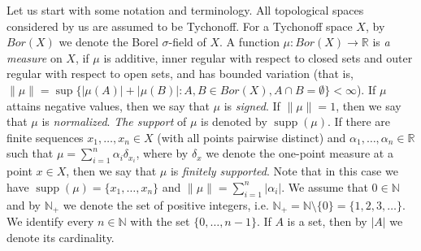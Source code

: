 \documentclass[11pt]{amsart}
\newtheorem{corollary}[theorem]{Corollary}
\theoremstyle{definition}
\theoremstyle{remark}
\numberwithin{equation}{section}
\newcommand{\N}{\mathbb{N}}
\newcommand{\R}{\mathbb{R}}
\newcommand{\sm}{\setminus}
\DeclareMathOperator{\supp}{supp}
\begin{document}


Let us start with some notation and terminology. All topological spaces considered by us are assumed to be Tychonoff. For a Tychonoff space $X$, by $Bor(X)$ we denote the Borel $\sigma$-field of $X$. A function $\mu\colon Bor(X)\to\R$ is \textit{a measure} on $X$, if $\mu$ is additive, inner regular with respect to closed sets and outer regular with respect to open sets, and has bounded variation (that is, $\|\mu\|=\sup\big\{|\mu(A)|+|\mu(B)|\colon A,B\in Bor(X), A\cap B=\emptyset\big\}<\infty$). If $\mu$ attains negative values, then we say that $\mu$ is \textit{signed}. If $\|\mu\|=1$, then we say that $\mu$ is \textit{normalized}. \textit{The support} of $\mu$ is denoted by $\supp(\mu)$. If there are finite sequences $x_1,\ldots,x_n\in X$ (with all points pairwise distinct) and $\alpha_1,\ldots,\alpha_n\in\R$ such that $\mu=\sum_{i=1}^n\alpha_i\delta_{x_i}$, where by $\delta_x$ we denote the one-point measure at a point $x\in X$, then we say that $\mu$ is \textit{finitely supported}. Note that in this case we have $\supp(\mu)=\big\{x_1,\ldots,x_n\big\}$ and $\|\mu\|=\sum_{i=1}^n\big|\alpha_i\big|$. We assume that $0\in\N$ and by $\N_+$ we denote the set of positive integers, i.e. $\N_+=\N\sm\{0\}=\{1,2,3,\ldots\}$. We identify every $n\in\N$ with the set $\{0,\ldots,n-1\}$. If $A$ is a set, then by $|A|$ we denote its cardinality.

\medskip
\end{document}
